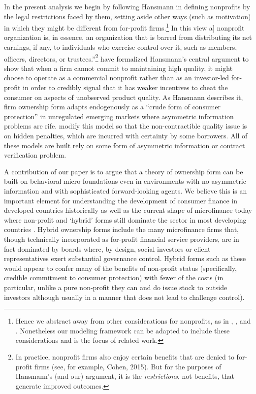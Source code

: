 \documentclass[11pt,english]{article}
\theoremstyle{plain}
\theoremstyle{definition}
\begin{document}
In the present analysis we begin by following Hansmann in defining
nonprofits by the legal restrictions faced by them, setting aside
other ways (such as motivation) in which they might be different from
for-profit firms.\footnote{Hence we abstract away from other considerations for nonprofits, as
in \citet{besley_competition_2005}, \citet{mcintosh_competition_2005},
and \citet{guha_micro-finance_2013}. Nonetheless our modeling framework
can be adapted to include these considerations and is the focus of
related work.} In this view \textquotedbl{}{[}a{]} nonprofit organization is, in
essence, an organization that is barred from distributing its net
earnings, if any, to individuals who exercise control over it, such
as members, officers, directors, or trustees.\textquotedblright \footnote{In practice, nonprofit firms also enjoy certain benefits that are
denied to for-profit firms (see, for example, Cohen, 2015). But for
the purposes of Hansmann's (and our) argument, it is the \textit{restrictions},
not benefits, that generate improved outcomes.} \citet{glaeser_not-for-profit_2001} have formalized Hansmann's central
argument to show that when a firm cannot commit to maintaining high
quality, it might choose to operate as a commercial nonprofit rather
than as an investor-led for-profit in order to credibly signal that
it has weaker incentives to cheat the consumer on aspects of unobserved
product quality. As Hansmann describes it, firm ownership form adapts
endogenously as a ``crude form of consumer protection'' in unregulated
emerging markets where asymmetric information problems are rife. \citet{bubb_consumer_2013}
modify this model so that the non-contractible quality issue is on
hidden penalties, which are incurred with certainty by some borrowers.
All of these models are built rely on some form of asymmetric information
or contract verification problem.

A contribution of our paper is to argue that a theory of ownership
form can be built on behavioral micro-foundations even in environments
with no asymmetric information and with sophisticated forward-looking
agents. We believe this is an important element for understanding
the development of consumer finance in developed countries historically
as well as the current shape of microfinance today where non-profit
and `hybrid' forms still dominate the sector in most developing countries
\citep{cull_microfinance_2009,conning_microfinance_2011}. Hybrid
ownership forms include the many microfinance firms that, though technically
incorporated as for-profit financial service providers, are in fact
dominated by boards where, by design, social investors or client representatives
exert substantial governance control. Hybrid forms such as these would
appear to confer many of the benefits of non-profit status (specifically,
credible commitment to consumer protection) with fewer of the costs
(in particular, unlike a pure non-profit they can and do issue stock
to outside investors although usually in a manner that does not lead
to challenge control).
\end{document}
